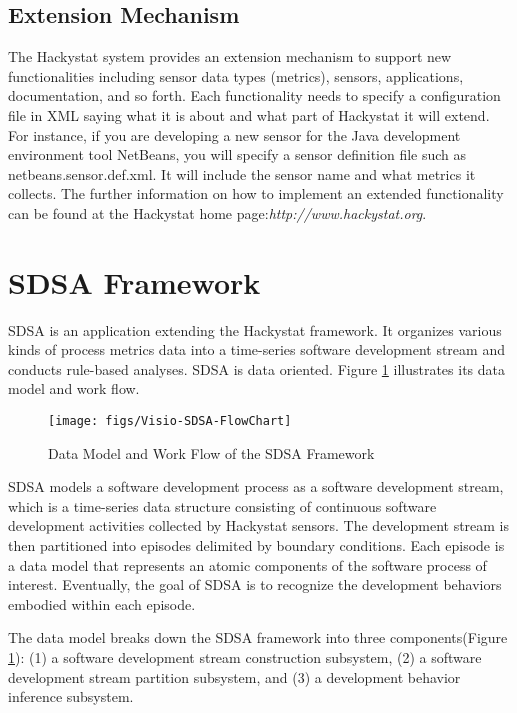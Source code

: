 \subsection{Extension Mechanism}
The Hackystat system provides an extension mechanism to support new 
functionalities including sensor data types (metrics), sensors, 
applications, documentation, and so forth. Each functionality needs 
to specify a configuration file in XML saying what it is about and 
what part of Hackystat it will extend. For instance, if you are developing a 
new sensor for the Java development environment tool NetBeans, you 
will specify a sensor definition file such as netbeans.sensor.def.xml. 
It will include the sensor name and
what metrics it collects. The further information on how to implement 
an extended functionality can be found at the Hackystat home 
page:\textit{http://www.hackystat.org}. 

\section{SDSA Framework}
SDSA is an application extending the Hackystat framework. It organizes
various kinds of process metrics data into a time-series software 
development stream and conducts rule-based analyses. SDSA is
data oriented. Figure \ref{fig:SDSA-Workflow} illustrates its data model
and work flow. 
\begin{figure}[htbp]
  \centering
  \texttt{[image: figs/Visio-SDSA-FlowChart]}
  \caption{Data Model and Work Flow of the SDSA Framework}
  \label{fig:SDSA-Workflow}
\end{figure}

SDSA models a software development process as a software development 
stream, which is a time-series data structure consisting of
continuous software development activities collected by Hackystat
sensors. The development stream 
is then partitioned into episodes delimited by boundary conditions. 
Each episode is a data model that represents an atomic components of 
the software process of interest. Eventually, the goal of SDSA is to 
recognize the development behaviors embodied within each episode. 

The data model breaks down the SDSA framework into three 
components(Figure \ref{fig:SDSA-Workflow}): (1) a software 
development stream construction subsystem, (2) a software 
development stream partition subsystem, and (3) a development 
behavior inference subsystem. 

